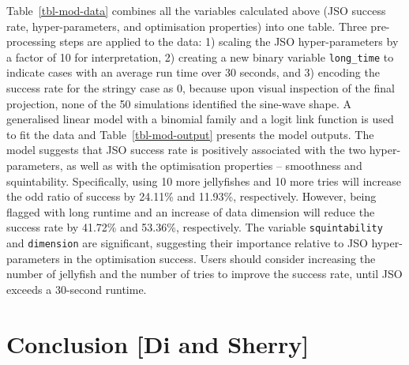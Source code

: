 \documentclass[
  number,
  preprint,
  3p]{elsarticle}
\begin{document}
\endgroup{}

Table~\ref{tbl-mod-data} combines all the variables calculated above
(JSO success rate, hyper-parameters, and optimisation properties) into
one table. Three pre-processing steps are applied to the data: 1)
scaling the JSO hyper-parameters by a factor of 10 for interpretation,
2) creating a new binary variable \texttt{long\_time} to indicate cases
with an average run time over 30 seconds, and 3) encoding the success
rate for the stringy case as 0, because upon visual inspection of the
final projection, none of the 50 simulations identified the sine-wave
shape. A generalised linear model with a binomial family and a logit
link function is used to fit the data and Table~\ref{tbl-mod-output}
presents the model outputs. The model suggests that JSO success rate is
positively associated with the two hyper-parameters, as well as with the
optimisation properties -- smoothness and squintability. Specifically,
using 10 more jellyfishes and 10 more tries will increase the odd ratio
of success by 24.11\% and 11.93\%, respectively. However, being flagged
with long runtime and an increase of data dimension will reduce the
success rate by 41.72\% and 53.36\%, respectively. The variable
\texttt{squintability} and \texttt{dimension} are significant,
suggesting their importance relative to JSO hyper-parameters in the
optimisation success. Users should consider increasing the number of
jellyfish and the number of tries to improve the success rate, until JSO
exceeds a 30-second runtime.

\section{Conclusion {[}Di and Sherry{]}}\label{sec-conclusion}


\renewcommand\refname{References}
  
\end{document}
